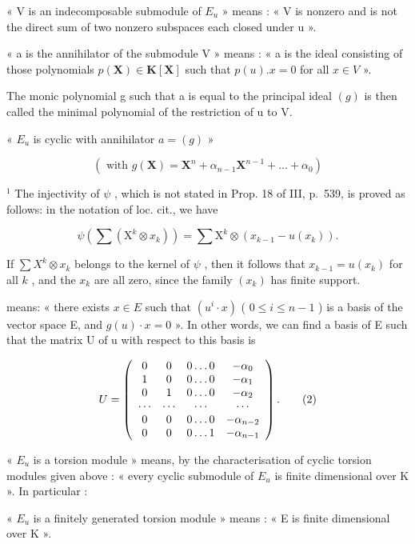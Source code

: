 « V is an indecomposable submodule of \(E_{u}\) » means : « V is nonzero and is not the direct sum of two nonzero subspaces each closed under u ».

« a is the annihilator of the submodule V » means : « a is the ideal consisting of those polynomials \(p(\mathbf{X}) \in \mathbf{K}[\mathbf{X}]\) such that \(p(u).x = 0\) for all \(x \in V\) ».

The monic polynomial g such that a is equal to the principal ideal \((g)\) is then called the minimal polynomial of the restriction of u to V.

« \(E_{u}\) is cyclic with annihilator \(a = (g)\) »

\[
\left(\text { with } g (\mathbf {X}) = \mathbf {X} ^ {n} + \alpha_ {n - 1} \mathbf {X} ^ {n - 1} + \dots + \alpha_ {0}\right)
\]

\(^{1}\) The injectivity of \(\psi\) , which is not stated in Prop. 18 of III, p.~539, is proved as follows: in the notation of loc. cit., we have

\[
\psi \left(\sum \left(\mathrm{X} ^ {k} \otimes x _ {k}\right)\right) = \sum \mathrm{X} ^ {k} \otimes \left(x _ {k - 1} - u (x _ {k})\right).
\]

If \(\sum X^k \otimes x_k\) belongs to the kernel of \(\psi\) , then it follows that \(x_{k-1} = u(x_k)\) for all \(k\) , and the \(x_k\) are all zero, since the family \((x_k)\) has finite support.

means: « there exists \(x \in E\) such that \((u^{i} \cdot x)\) ( \(0 \leqslant i \leqslant n - 1\) ) is a basis of the vector space E, and \(g(u) \cdot x = 0\) ». In other words, we can find a basis of E such that the matrix U of u with respect to this basis is

\[
U = \left( \begin{array}{c c c c} 0 & 0 & 0 \dots 0 & - \alpha_ {0} \\ 1 & 0 & 0 \dots 0 & - \alpha_ {1} \\ 0 & 1 & 0 \dots 0 & - \alpha_ {2} \\ \cdots & \cdots & \cdots & \cdots \\ 0 & 0 & 0 \dots 0 & - \alpha_ {n - 2} \\ 0 & 0 & 0 \dots 1 & - \alpha_ {n - 1} \end{array} \right).\tag{2}
\]

« \(E_{u}\) is a torsion module » means, by the characterisation of cyclic torsion modules given above : « every cyclic submodule of \(E_{u}\) is finite dimensional over K ». In particular :

« \(E_{u}\) is a finitely generated torsion module » means : « E is finite dimensional over K ».

